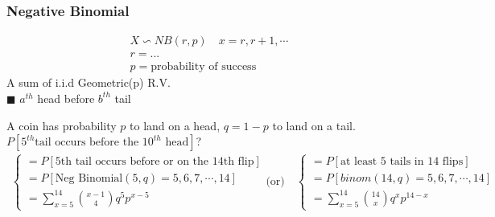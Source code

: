 \subsubsection*{Negative Binomial}
\begin{gather*}
	X \backsim NB(r,p) \quad x = r, r+1, \cdots \\
	r = \text{...}\\
	p = \text{probability of success}
\end{gather*}
A sum of i.i.d Geometric(p) R.V.\\
$\blacksquare$ $a^{th}$ head before $b^{th}$ tail
\begin{example}
	A coin has probability $p$ to land on a head, $q = 1-p$ to land on a tail.\\
	$P[5^{th} \text{tail occurs before the } 10^{th} \text{ head}]$?
	\begin{gather*}
	\begin{cases}
		= P[\text{5th tail occurs before or on the 14th flip}]\\
		= P[\text{Neg Binomial}(5,q) = 5,6,7,\cdots, 14]\\
		= \sum\limits_{x=5}^{14} \binom{x-1}{4} q^5 p^{x-5}
	\end{cases}	\text{(or)} \quad
	\begin{cases}
		= P[\text{at least 5 tails in 14 flips}]\\
		= P[binom(14,q) = 5,6,7,\cdots, 14]\\
		= \sum\limits_{x=5}^{14} \binom{14}{x} q^x p^{14-x}
	\end{cases}
	\end{gather*}
\end{example}
